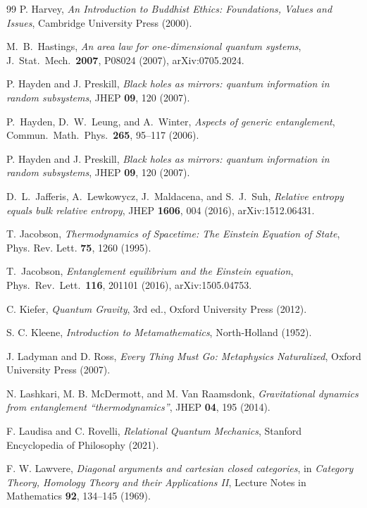 \documentclass[12pt,a4paper,openany]{book}
\begin{document}
\begin{thebibliography}{99}
P. Harvey, \emph{An Introduction to Buddhist Ethics: Foundations, Values and Issues}, Cambridge University Press (2000).


M.~B.~Hastings,
\emph{An area law for one-dimensional quantum systems},
J.\ Stat.\ Mech.\ \textbf{2007}, P08024 (2007),
arXiv:0705.2024.

P. Hayden and J. Preskill, \emph{Black holes as mirrors: quantum information in random subsystems}, JHEP \textbf{09}, 120 (2007).

P.~Hayden, D.~W.~Leung, and A.~Winter,
\emph{Aspects of generic entanglement},
Commun.\ Math.\ Phys.\ \textbf{265}, 95--117 (2006).

P. Hayden and J. Preskill, \emph{Black holes as mirrors: quantum information in random subsystems}, JHEP \textbf{09}, 120 (2007).

D.~L.~Jafferis, A.~Lewkowycz, J.~Maldacena, and S.~J.~Suh,
\emph{Relative entropy equals bulk relative entropy},
JHEP \textbf{1606}, 004 (2016),
arXiv:1512.06431.

T. Jacobson, \emph{Thermodynamics of Spacetime: The Einstein Equation of State}, Phys. Rev. Lett. \textbf{75}, 1260 (1995).

T.~Jacobson,
\emph{Entanglement equilibrium and the Einstein equation},
Phys.\ Rev.\ Lett.\ \textbf{116}, 201101 (2016),
arXiv:1505.04753.

C. Kiefer, \emph{Quantum Gravity}, 3rd ed., Oxford University Press (2012).

S. C. Kleene, \emph{Introduction to Metamathematics}, North-Holland (1952).

J. Ladyman and D. Ross, \emph{Every Thing Must Go: Metaphysics Naturalized}, Oxford University Press (2007).

N. Lashkari, M. B. McDermott, and M. Van Raamsdonk, \emph{Gravitational dynamics from entanglement ``thermodynamics''}, JHEP \textbf{04}, 195 (2014).

F. Laudisa and C. Rovelli, \emph{Relational Quantum Mechanics}, Stanford Encyclopedia of Philosophy (2021).

F. W. Lawvere, \emph{Diagonal arguments and cartesian closed categories}, in \emph{Category Theory, Homology Theory and their Applications II}, Lecture Notes in Mathematics \textbf{92}, 134--145 (1969).


\end{thebibliography}
\end{document}
